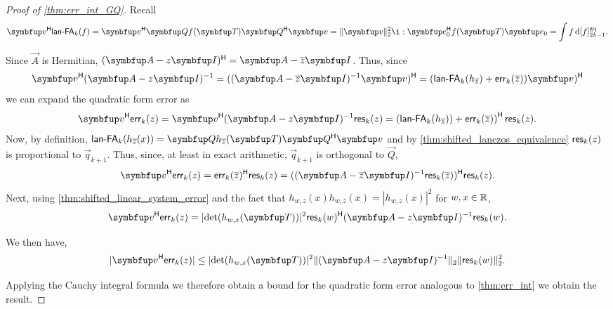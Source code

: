 \begin{proof}[Proof of \cref{thm:err_int_GQ}]
Recall
    \begin{equation*}
    \vec{v}^\cT \lan_k(f) 
    = \vec{v}^\cT \vec{Q} \fT \vec{Q}^\cT \vec{v}
    = \| \vec{v} \|_2^2\i: \vec{e}_0^\cT \fT \vec{e}_0
    = \int f \,\d\qq[g]{f}{2k-1}.
\end{equation*}

Since \( \vec{A} \) is Hermitian, \( (\vec{A} - z\vec{I})^\cT = \vec{A} - \overline{z} \vec{I} \). 
Thus, since 
\begin{equation*}
    \vec{v}^\cT (\vec{A} - z\vec{I})^{-1}
    = ( ( \vec{A} - \overline{z} \vec{I}   )^{-1} \vec{v} )^\cT
    = ( \lan_k(h_{\overline{z}}) + \err_k(\overline{z}) ) \vec{v} )^\cT
\end{equation*}
we can expand the quadratic form error as
\begin{equation*}
    \vec{v}^\cT \err_k(z)
    = \vec{v}^\cT ( \vec{A} - z \vec{I})^{-1} \Res_k(z)
    = \left( \lan_k ( h_{\overline{z}} ) ) + \err_k(\overline{z}) \right)^\cT \Res_k(z).
\end{equation*}
Now, by definition, \( \lan_k ( h_{\overline{z}}(x) )  = \vec{Q} h_{\overline{z}}(\vec{T}) \vec{Q}^\cT \vec{v} \) and by \cref{thm:shifted_lanczos_equivalence} \( \textup{\textsf{res}}_k(z) \) is proportional to \( \vec{q}_{k+1} \).
Thus, since, at least in exact arithmetic, \( \vec{q}_{k+1} \) is orthogonal to $\vec{Q}$,
\begin{equation*}
    \vec{v}^\cT \err_k(z)
    = \err_k(\overline{z})^\cT \Res_k(z)
    = (( \vec{A} - \overline{z}\vec{I})^{-1}  \Res_k(\overline{z}))^\cT \Res_k(z).
\end{equation*}
Next, using \cref{thm:shifted_linear_system_error} and the fact that \( h_{w,z}(x) h_{w,\overline{z}}(x) = |h_{w,z}(x)|^2 \) for \( w,x\in\mathbb{R} \), 
\begin{equation*}
    \vec{v}^\cT \err_k(z)
    = |\!\det(h_{w,z}(\vec{T}))|^2 \Res_k(w)^\cT ( \vec{A} - z\vec{I})^{-1} \Res_k(w).
\end{equation*}

We then have,
\begin{equation*}
    | \vec{v}^\cT \err_k(z) |
    \leq | \! \det(h_{w,z}(\vec{T})) |^2  \| ( \vec{A} - z\vec{I})^{-1} \|_2  \| \Res_k(w) \|_2^2.
\end{equation*}

Applying the Cauchy integral formula we therefore obtain a bound for the quadratic form error analogous to \cref{thm:err_int} we obtain the result.
\end{proof}


